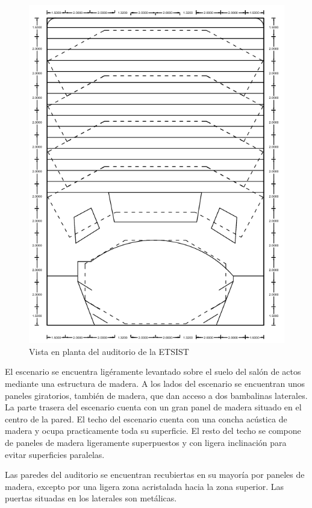 \documentclass[11pt,a4paper,twoside]{book}
\begin{document}
 			\begin{figure}
				\includegraphics[scale=0.6]{../imagenes/auditorio.png}
				\centering
				\caption{Vista en planta del auditorio de la ETSIST}
				\label{fig:auditorio}
			\end{figure}
 
 			El escenario se encuentra ligéramente levantado sobre el suelo del salón de actos mediante una estructura de madera. A los lados del escenario se encuentran unos paneles giratorios, también de madera, que dan acceso a dos bambalinas laterales. La parte trasera del escenario cuenta con un gran panel de madera situado en el centro de la pared. El techo del escenario cuenta con una concha acústica de madera y ocupa practicamente toda su superficie. El resto del techo se compone de paneles de madera ligeramente superpuestos y con ligera inclinación para evitar superficies paralelas.
 
 			Las paredes del auditorio se encuentran recubiertas en su mayoría por paneles de madera, excepto por una ligera zona acristalada hacia la zona superior. Las puertas situadas en los laterales son metálicas. 
 
\end{document}
